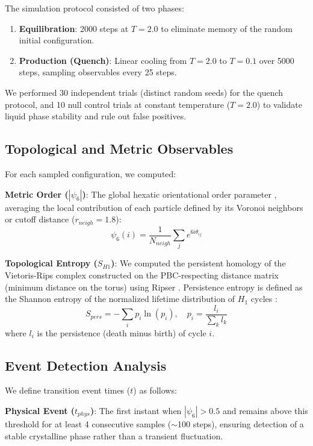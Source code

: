 \documentclass[twocolumn,showpacs,preprintnumbers,amsmath,amssymb,prb,floatfix]{revtex4-2}
\begin{document}
The simulation protocol consisted of two phases:
\begin{enumerate}
    \item \textbf{Equilibration}: 2000 steps at $T=2.0$ to eliminate memory of the random initial configuration.
    \item \textbf{Production (Quench)}: Linear cooling from $T=2.0$ to $T=0.1$ over 5000 steps, sampling observables every 25 steps.
\end{enumerate}

We performed 30 independent trials (distinct random seeds) for the quench protocol, and 10 null control trials at constant temperature ($T=2.0$) to validate liquid phase stability and rule out false positives.

\subsection{Topological and Metric Observables}

For each sampled configuration, we computed:

\textbf{Metric Order ($|\psi_6|$)}: The global hexatic orientational order parameter \cite{kosterlitz1973,halperin1978}, averaging the local contribution of each particle defined by its Voronoi neighbors or cutoff distance ($r_{neigh}=1.8$):
\begin{equation}
\psi_6(i) = \frac{1}{N_{neigh}} \sum_{j} e^{6i\theta_{ij}}
\end{equation}

\textbf{Topological Entropy ($S_{H1}$)}: We computed the persistent homology of the Vietoris-Rips complex constructed on the PBC-respecting distance matrix (minimum distance on the torus) using Ripser \cite{tralie2018}. Persistence entropy is defined as the Shannon entropy of the normalized lifetime distribution of $H_1$ cycles \cite{atienza2020}:
\begin{equation}
S_{pers} = -\sum_i p_i \ln(p_i), \quad p_i = \frac{l_i}{\sum_k l_k}
\end{equation}
where $l_i$ is the persistence (death minus birth) of cycle $i$.

\subsection{Event Detection Analysis}

We define transition event times ($t$) as follows:

\textbf{Physical Event ($t_{phys}$)}: The first instant when $|\psi_6| > 0.5$ and remains above this threshold for at least 4 consecutive samples ($\sim$100 steps), ensuring detection of a stable crystalline phase rather than a transient fluctuation.
\end{document}

